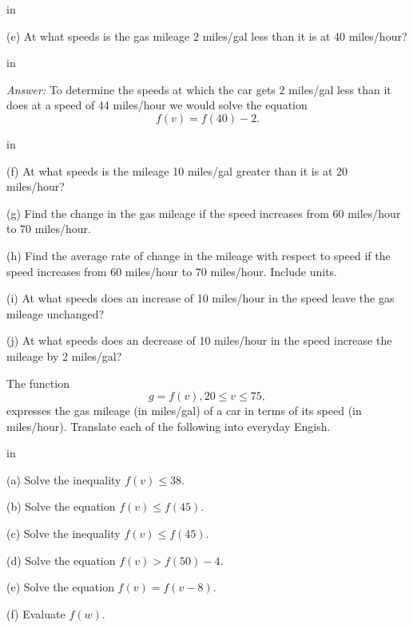 \documentclass{ximera}
\newcommand{\pskip}{\vskip 0.1 in}
\begin{document}
\begin{example}
\pskip

\noindent (e) At what speeds is the gas mileage $2$ miles/gal less than it is at 40 miles/hour?

\pskip

\emph{Answer:} To determine the speeds at which the car gets $2$ miles/gal less than it does at a speed of 44 miles/hour we would solve the equation
\[
       f(v) = f(40) - 2.
\]

\pskip

\noindent (f) At what speeds is the mileage 10 miles/gal greater than it is at 20 miles/hour?

\noindent (g) Find the change in the gas mileage if the speed increases from 60 miles/hour to 70 miles/hour.

\noindent (h) Find the average rate of change in the mileage with respect to speed if the speed increases from 60 miles/hour to 70 miles/hour. Include units.

\noindent (i) At what speeds does an increase of 10 miles/hour in the speed leave the gas mileage unchanged?

\noindent (j) At what speeds does an decrease of 10 miles/hour in the speed increase the mileage by 2 miles/gal?

\end{example}


\begin{example}  \label{ExFun2}

The function
\[
   g = f(v) , 20 \leq v \leq 75 ,
\]
expresses the gas mileage (in miles/gal) of a car in terms of its speed (in miles/hour). Translate each of the following into everyday Engish.

\pskip

\noindent (a) Solve the inequality $f(v)\leq 38$.

\noindent (b) Solve the equation $f(v) \leq f(45)$.

\noindent (c) Solve the inequality $f(v) \leq f(45)$.

\noindent (d) Solve the equation $f(v)> f(50)-4$.

\noindent (e) Solve the equation $f(v)=f(v-8)$.

\noindent (f) Evaluate $f(w)$.

\end{example}
\end{document}
